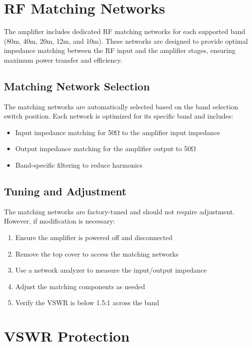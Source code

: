 \documentclass[11pt,a4paper]{article}
\begin{document}
\section{RF Matching Networks}
\label{sec:rf_matching}

The amplifier includes dedicated RF matching networks for each supported band (80m, 40m, 20m, 12m, and 10m). These networks are designed to provide optimal impedance matching between the RF input and the amplifier stages, ensuring maximum power transfer and efficiency.

\subsection{Matching Network Selection}
The matching networks are automatically selected based on the band selection switch position. Each network is optimized for its specific band and includes:
\begin{itemize}
    \item Input impedance matching for 50Ω to the amplifier input impedance
    \item Output impedance matching for the amplifier output to 50Ω
    \item Band-specific filtering to reduce harmonics
\end{itemize}

\subsection{Tuning and Adjustment}
The matching networks are factory-tuned and should not require adjustment. However, if modification is necessary:
\begin{enumerate}
    \item Ensure the amplifier is powered off and disconnected
    \item Remove the top cover to access the matching networks
    \item Use a network analyzer to measure the input/output impedance
    \item Adjust the matching components as needed
    \item Verify the VSWR is below 1.5:1 across the band
\end{enumerate}

\section{VSWR Protection}
\label{sec:vswr_protection}
\end{document}
